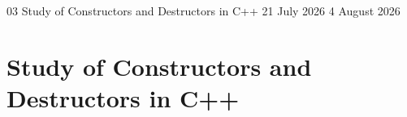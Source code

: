\GenerateCoverPage
{03} %
{Study of Constructors and Destructors in C++} %
{21 July 2026} %
{4 August 2026} %

\noindent
\chapter{Study of Constructors and Destructors in C++}







\setcounter{section}{0}
